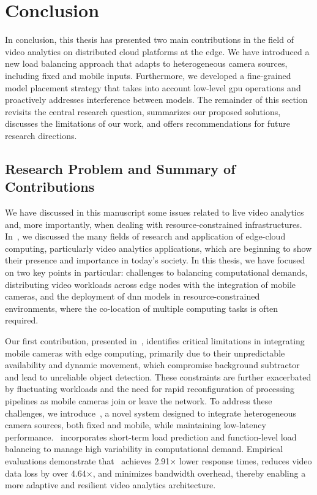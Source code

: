 \setchapterpreamble[u]{\margintoc}
\chapter{Conclusion}

In conclusion, this thesis has presented two main contributions in the field of video analytics on distributed cloud platforms at the edge. We have introduced a new load balancing approach that adapts to heterogeneous camera sources, including fixed and mobile inputs. Furthermore, we developed a fine-grained model placement strategy that takes into account low-level \acrshort{gpu} operations and proactively addresses interference between models. The remainder of this section revisits the central research question, summarizes our proposed solutions, discusses the limitations of our work, and offers recommendations for future research directions.

\section{Research Problem and Summary of Contributions}

We have discussed in this manuscript some issues related to live video analytics and, more importantly, when dealing with resource-constrained infrastructures. In~, we discussed the many fields of research and application of edge-cloud computing, particularly video analytics applications, which are beginning to show their presence and importance in today's society. In this thesis, we have focused on two key points in particular: challenges to balancing computational demands, distributing video workloads across edge nodes with the integration of mobile cameras, and the deployment of \acrfull{dnn} models in resource-constrained environments, where the co-location of multiple computing tasks is often required.


Our first contribution, presented in~, identifies critical limitations in integrating mobile cameras with edge computing, primarily due to their unpredictable availability and dynamic movement, which compromise background subtractor and lead to unreliable object detection. These constraints are further exacerbated by fluctuating workloads and the need for rapid reconfiguration of processing pipelines as mobile cameras join or leave the network. To address these challenges, we introduce~\videojam{}, a novel system designed to integrate heterogeneous camera sources, both fixed and mobile, while maintaining low-latency performance.~\videojam{} incorporates short-term load prediction and function-level load balancing to manage high variability in computational demand. Empirical evaluations demonstrate that~\videojam{} achieves 2.91× lower response times, reduces video data loss by over 4.64×, and minimizes bandwidth overhead, thereby enabling a more adaptive and resilient video analytics architecture.


